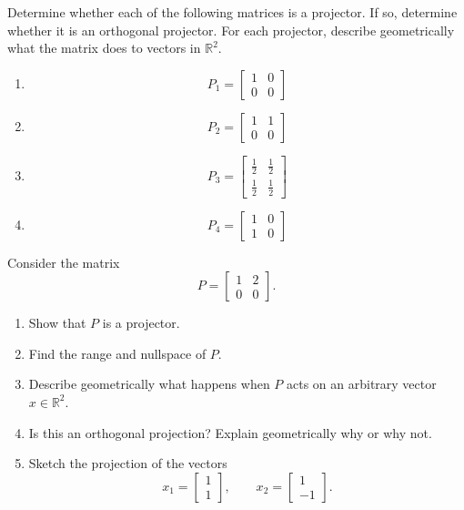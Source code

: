\documentclass{ximera}
\begin{document}
\begin{exercise}
Determine whether each of the following matrices is a projector. If so, determine whether it is an orthogonal projector. For each projector, describe geometrically what the matrix does to vectors in $\mathbb{R}^2$.

\begin{enumerate}
    \item
    \[
    P_1 =
    \begin{bmatrix}
    1 & 0 \\
    0 & 0
    \end{bmatrix}
    \]

    \item
    \[
    P_2 =
    \begin{bmatrix}
    1 & 1 \\
    0 & 0
    \end{bmatrix}
    \]

    \item
    \[
    P_3 =
    \begin{bmatrix}
    \frac{1}{2} & \frac{1}{2} \\
    \frac{1}{2} & \frac{1}{2}
    \end{bmatrix}
    \]

    \item
    \[
    P_4 =
    \begin{bmatrix}
    1 & 0 \\
    1 & 0
    \end{bmatrix}
    \]
\end{enumerate}
\end{exercise}


\begin{exercise}
Consider the matrix
\[
P =
\begin{bmatrix}
1 & 2 \\
0 & 0
\end{bmatrix}.
\]

\begin{enumerate}
    \item Show that $P$ is a projector.
    \item Find the range and nullspace of $P$.
    \item Describe geometrically what happens when $P$ acts on an arbitrary vector $x \in \mathbb{R}^2$.
    \item Is this an orthogonal projection? Explain geometrically why or why not.
    \item Sketch the projection of the vectors
    \[
    x_1 =
    \begin{bmatrix}
    1 \\ 1
    \end{bmatrix},
    \qquad
    x_2 =
    \begin{bmatrix}
    1 \\ -1
    \end{bmatrix}.
    \]
\end{enumerate}
\end{exercise}
\end{document}
